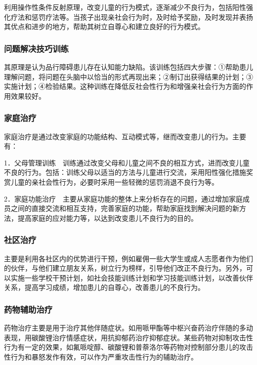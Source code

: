 利用操作性条件反射原理，改变儿童的行为模式，逐渐减少不良行为，包括阳性强化疗法和惩罚疗法等。当孩子出现亲社会行为时，及时给予奖励，及时发现并表扬其优点和进步的地方，帮助其树立自尊心和建立良好的行为模式。

\subsubsection{问题解决技巧训练}

其原理是认为品行障碍患儿存在认知能力缺陷。该训练包括四大步骤：①帮助患儿理解问题，将问题在头脑中以恰当的形式再现出来；②制订出获得结果的计划；③实施计划；④检验结果。这种训练在降低反社会性行为和增强亲社会行为方面的作用效果较好。

\subsubsection{家庭治疗}

家庭治疗是通过改变家庭的功能结构、互动模式等，继而改变患儿的行为。主要有：

1．父母管理训练　训练通过改变父母和儿童之间不良的相互方式，进而改变儿童不良的行为。包括：训练父母以适当的方法与儿童进行交流，采用阳性强化措施奖赏儿童的亲社会性行为，必要时采用一些轻微的惩罚消退不良行为等。

2．家庭功能治疗　主要从家庭功能的整体上来分析存在的问题，通过增加家庭成员之间的直接交流和相互支持，完善家庭的功能，帮助家庭找到解决问题的新方法，提高家庭的应对能力等，以达到改变患儿不良行为的目的。

\subsubsection{社区治疗}

主要是利用各社区内的优势进行干预，例如雇佣一些大学生或成人志愿者作为他们的伙伴，与他们建立朋友关系，树立行为榜样，引导他们改正不良行为。另外，可以实施一些学校干预计划，如社会技能训练计划和学习技能训练计划，以改善伙伴关系，提高学习成绩，增加患儿的自尊心，改善患儿的不良行为。

\subsubsection{药物辅助治疗}

药物治疗主要是用于治疗其他伴随症状。如用哌甲酯等中枢兴奋药治疗伴随的多动表现，用碳酸锂治疗情感症状，用抗抑郁药治疗抑郁症状。某些药物对抑制攻击性行为有一定的效果，如氟哌啶醇、碳酸锂和普萘洛尔等药物对控制部分患儿的攻击性行为和暴怒发作有效，可以作为严重攻击性行为的辅助治疗。


